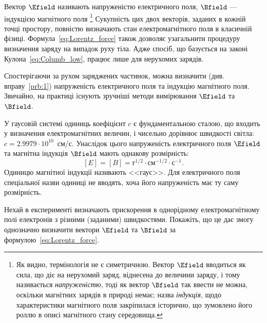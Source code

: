 Вектор $\Efield$ називають напруженістю електричного поля, $\Bfield$ --- індукцією
магнітного поля%
\footnote{%
	Як видно, термінологія не є симетричною. Вектор $\Efield$ вводиться як сила, що діє на нерухомий заряд, віднесена до
	величини заряду, і тому називається \emph{напруженістю}, тоді як вектор $\Bfield$ так ввести не можна, оскільки
	магнітних зарядів в природі немає; назва \emph{індукція}, щодо характеристики магнітного поля закріпилася історично,
    що зумовлено його роллю в описі магнітного стану середовища.%
} Сукупність цих двох векторів, заданих в кожній точці простору, повністю визначають стан електромагнітного поля в
класичній фізиці. Формула~\eqref{eq:Lorentz_force} також дозволяє узагальнити процедуру визначення заряду на випадок
руху тіла. Адже спосіб, що базується на законі Кулона~\eqref{eq:Columb_low}, працює лише для нерухомих зарядів.

Спостерігаючи за рухом заряджених частинок, можна визначити (див. вправу~\ref{prb:1}) напруженість електричного поля та
індукцію магнітного поля. Звичайно, на практиці існують зручніші методи вимірювання $\Efield$ та $\Bfield$.


У гаусовій системі одиниць коефіцієнт $c$ є фундаментальною сталою, що входить у визначення електромагнітних величин, і
чисельно дорівнює швидкості світла: $c = 2.9979\cdot10^{10}$~см/с. Унаслідок цього напруженість електричного поля
$\Efield$ та магнітна індукція $\Bfield$ мають однакову розмірність:
\begin{equation*}
	\left[ E \right] = \left[ B \right] =
	\text{г}^{1/2}\cdot\text{см}^{-1/2}\cdot\text{с}^{-1}.
\end{equation*}
Одиницю магнітної індукції називають <<гаус>>. Для електричного поля спеціальної назви одиниці не вводять, хоча його
напруженість має ту саму розмірність.

\begin{problem}\label{prb:1}%
	Нехай в експерименті визначають прискорення в однорідному електромагнітному полі електронів з різними (заданими)
	швидкостями. Покажіть, що це дає змогу однозначно визначити вектори $\Efield$ та $\Bfield$ за
	формулою~\eqref{eq:Lorentz_force}.
\end{problem}

